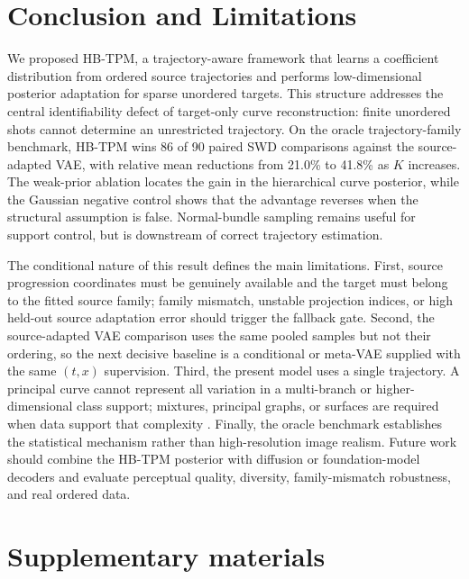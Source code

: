 \documentclass[preprint,12pt,number]{elsarticle}
\begin{document}
\newpage
\section{Conclusion and Limitations}
We proposed HB-TPM, a trajectory-aware framework that learns a coefficient distribution from ordered source trajectories and performs low-dimensional posterior adaptation for sparse unordered targets. This structure addresses the central identifiability defect of target-only curve reconstruction: finite unordered shots cannot determine an unrestricted trajectory. On the oracle trajectory-family benchmark, HB-TPM wins 86 of 90 paired SWD comparisons against the source-adapted VAE, with relative mean reductions from 21.0\% to 41.8\% as $K$ increases. The weak-prior ablation locates the gain in the hierarchical curve posterior, while the Gaussian negative control shows that the advantage reverses when the structural assumption is false. Normal-bundle sampling remains useful for support control, but is downstream of correct trajectory estimation.

The conditional nature of this result defines the main limitations. First, source progression coordinates must be genuinely available and the target must belong to the fitted source family; family mismatch, unstable projection indices, or high held-out source adaptation error should trigger the fallback gate. Second, the source-adapted VAE comparison uses the same pooled samples but not their ordering, so the next decisive baseline is a conditional or meta-VAE supplied with the same $(t,x)$ supervision. Third, the present model uses a single trajectory. A principal curve cannot represent all variation in a multi-branch or higher-dimensional class support; mixtures, principal graphs, or surfaces are required when data support that complexity \citep{ozertem2011locally, hauberg2015principal, han2026few}. Finally, the oracle benchmark establishes the statistical mechanism rather than high-resolution image realism. Future work should combine the HB-TPM posterior with diffusion or foundation-model decoders and evaluate perceptual quality, diversity, family-mismatch robustness, and real ordered data.


%

\newpage
\section{Supplementary materials}
\end{document}
